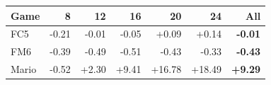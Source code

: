 \begin{tabular}{@{}lrrrrrr@{}}
\toprule
\textbf{Game} & \textbf{8} & \textbf{12} & \textbf{16} & \textbf{20} & \textbf{24} & \textbf{All} \\
\midrule
FC5 & -0.21 & -0.01 & -0.05 & +0.09 & +0.14 & \textbf{-0.01} \\
FM6 & -0.39 & -0.49 & -0.51 & -0.43 & -0.33 & \textbf{-0.43} \\
Mario & -0.52 & +2.30 & +9.41 & +16.78 & +18.49 & \textbf{+9.29} \\
\bottomrule
\end{tabular}
